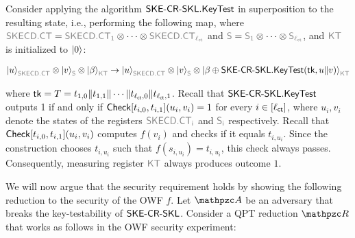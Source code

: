 Consider applying the algorithm $\SKECRSKL.\KeyTest$ in
superposition to the resulting state, i.e., performing the following
map, where $\qreg{\SKECD.CT} = \qreg{\SKECD.CT_1} \otimes \cdots
\otimes \qreg{\SKECD.CT_{\ctlen}}$ and $\qreg{S} =
\qreg{S_1} \otimes \cdots \otimes \qreg{S_{\ctlen}}$, and
$\qreg{KT}$ is initialized to $\ket{0}$:

\begin{align}
\ket{u}_{\qreg{SKECD.
CT}}\tensor\ket{v}_{\qreg{S}}\tensor\ket{\beta}_{\qreg{KT}} \ra
\ket{u}_{\qreg{SKECD.
CT}}\tensor\ket{v}_{\qreg{S}}\tensor\ket{\beta\oplus\SKECRSKL.
\KeyTest(\tk, u\|v)}_{\qreg{KT}}
\end{align}

where $\tk = T = t_{1, 0}\|t_{1, 1} \| \cdots \| t_{\ctlen,
0}\|t_{\ctlen, 1}$. Recall that $\SKECRSKL.\KeyTest$
outputs 1 if
and only if $\Check[t_{i,0}, t_{i, 1}](u_i,
v_i) = 1$ for every $i
\in [\ctlen]$, where $u_i, v_i$ denote the states of the registers
$\qreg{SKECD.CT_i}$ and $\qreg{S_i}$ respectively.
Recall that $\Check[t_{i,0},t_{i,1}](u_i, v_i)$ computes $f(v_i)$
and checks if it equals $t_{i, u_i}$. Since the construction chooses
$t_{i, u_i}$ such that $f(s_{i, u_i}) = t_{i, u_i}$, this check
always passes. Consequently, measuring register $\qreg{KT}$ always
produces outcome $1$.

We will now argue that the security requirement holds by showing the
following reduction to the security of the OWF $f$. Let $\qA$ be an
adversary that breaks the key-testability of $\SKECRSKL$. Consider
a QPT reduction $\qR$ that works as follows in the OWF security
experiment:

